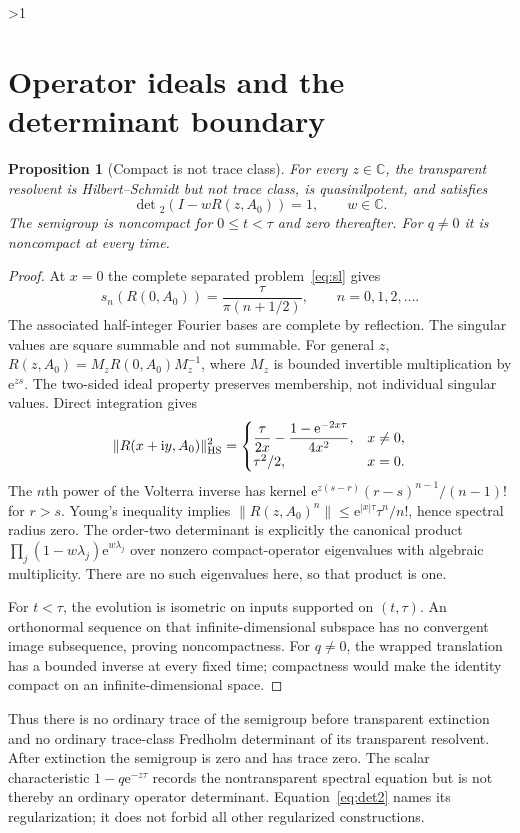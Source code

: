 \documentclass[10pt]{article}
\newcommand{\ii}{\mathrm i}
\newcommand{\e}{\mathrm e}
\newcommand{\C}{\mathbb C}
\newtheorem{proposition}{Proposition}
\begin{document}
\ifnum\CRevisionRound>1
\section{Operator ideals and the determinant boundary}
\begin{proposition}[Compact is not trace class]
For every $z\in\C$, the transparent resolvent is Hilbert--Schmidt but not
trace class, is quasinilpotent, and satisfies
\begin{equation}
 \det{}_2(I-wR(z,A_0))=1,\qquad w\in\C.
 \label{eq:det2}
\end{equation}
The semigroup is noncompact for $0\leq t<\tau$ and zero thereafter.
For $q\ne0$ it is noncompact at every time.
\end{proposition}
\begin{proof}
At $x=0$ the complete separated problem~\eqref{eq:sl} gives
\begin{equation}
 s_n(R(0,A_0))=\frac{\tau}{\pi(n+1/2)},\qquad n=0,1,2,\ldots.
 \label{eq:singular}
\end{equation}
The associated half-integer Fourier bases are complete by reflection.
The singular values are square summable and not summable.
For general $z$, $R(z,A_0)=M_zR(0,A_0)M_z^{-1}$, where $M_z$ is bounded
invertible multiplication by $\e^{zs}$. The two-sided ideal property
preserves membership, not individual singular values. Direct integration gives
\begin{equation}
 \|R(x+\ii y,A_0)\|_{\rm HS}^2=
 \begin{cases}
 \displaystyle\frac{\tau}{2x}-\frac{1-\e^{-2x\tau}}{4x^2},&x\ne0,\\
 \tau^2/2,&x=0.
 \end{cases}
\end{equation}
The $n$th power of the Volterra inverse has kernel
$\e^{z(s-r)}(r-s)^{n-1}/(n-1)!$ for $r>s$.
Young's inequality implies
$\|R(z,A_0)^n\|\leq\e^{|x|\tau}\tau^n/n!$, hence spectral radius zero.
The order-two determinant is explicitly the canonical product
$\prod_j(1-w\lambda_j)\e^{w\lambda_j}$ over nonzero compact-operator
eigenvalues with algebraic multiplicity. There are no such eigenvalues here,
so that product is one.

For $t<\tau$, the evolution is isometric on inputs supported on $(t,\tau)$.
An orthonormal sequence on that infinite-dimensional subspace has no
convergent image subsequence, proving noncompactness. For $q\ne0$, the
wrapped translation has a bounded inverse at every fixed time; compactness
would make the identity compact on an infinite-dimensional space.
\end{proof}
Thus there is no ordinary trace of the semigroup before transparent
extinction and no ordinary trace-class Fredholm determinant of its
transparent resolvent. After extinction the semigroup is zero and has trace
zero. The scalar characteristic $1-q\e^{-z\tau}$ records the nontransparent
spectral equation but is not thereby an ordinary operator determinant.
Equation~\eqref{eq:det2} names its regularization; it does not forbid all
other regularized constructions.
\end{document}
